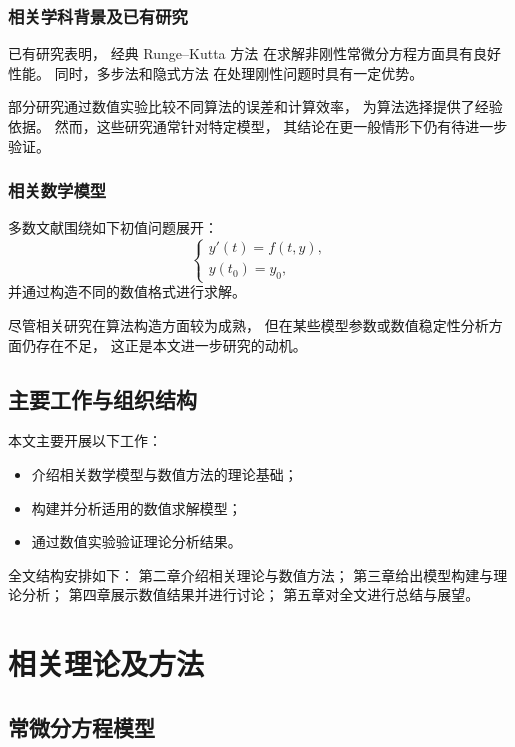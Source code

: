 \documentclass[UTF8, a4paper, zihao=-4]{ctexart} %
\numberwithin{equation}{section}%
\begin{document}
\subsubsection{相关学科背景及已有研究}

已有研究表明\cite{doi:10.1137/0709037}，
经典 Runge--Kutta 方法
在求解非刚性常微分方程方面具有良好性能。
同时，多步法和隐式方法
在处理刚性问题时具有一定优势。

部分研究通过数值实验比较不同算法的误差和计算效率，
为算法选择提供了经验依据。
然而，这些研究通常针对特定模型，
其结论在更一般情形下仍有待进一步验证。

\subsubsection{相关数学模型}

多数文献围绕如下初值问题展开：
\begin{equation}
\begin{cases}
y'(t) = f(t,y), \\
y(t_0) = y_0,
\end{cases}
\end{equation}
并通过构造不同的数值格式进行求解。

尽管相关研究在算法构造方面较为成熟，
但在某些模型参数或数值稳定性分析方面仍存在不足，
这正是本文进一步研究的动机。

\subsection{主要工作与组织结构}

本文主要开展以下工作：
\begin{itemize}
  \item 介绍相关数学模型与数值方法的理论基础；
  \item 构建并分析适用的数值求解模型；
  \item 通过数值实验验证理论分析结果。
\end{itemize}

全文结构安排如下：
第二章介绍相关理论与数值方法；
第三章给出模型构建与理论分析；
第四章展示数值结果并进行讨论；
第五章对全文进行总结与展望。

\newpage
\section{相关理论及方法}

\subsection{常微分方程模型}
\end{document}
